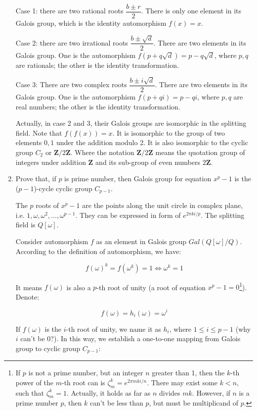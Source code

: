 \documentclass[UTF8]{article}
\begin{document}
\begin{enumerate}
Case 1: there are two rational roots $\dfrac{b \pm r}{2}$. There is only one element in its Galois group, which is the identity automorphism $f(x) = x$.

Case 2: there are two irrational roots $\dfrac{b \pm \sqrt{d}}{2}$. There are two elements in its Galois group. One is the automorphism $f(p + q \sqrt{d}) = p - q \sqrt{d}$, where $p, q$ are rationals; the other is the identity transformation.

Case 3: There are two complex roots $\dfrac{b \pm i \sqrt{d}}{2}$. There are two elements in its Galois group. One is the automorphism $f(p + q i) = p - q i$, where $p, q$ are real numbers; the other is the identity transformation.

Actually, in case 2 and 3, their Galois groups are isomorphic in the splitting field. Note that $f(f(x)) = x$. It is isomorphic to the group of two elements ${0, 1}$ under the addition modulo 2. It is also isomorphic to the cyclic group $C_2$ or $\pmb{Z}/2\pmb{Z}$. Where the notation $\pmb{Z}/2\pmb{Z}$ means the quotation group of integers under addition $\pmb{Z}$ and its sub-group of even numbers $2\pmb{Z}$.

\item{Prove that, if $p$ is prime number, then Galois group for equation $x^p - 1$ is the ($p-1$)-cycle cyclic group $C_{p-1}$.}

The $p$ roots of $x^p - 1$ are the points along the unit circle in complex plane, i.e. $1, \omega, \omega^2, ..., \omega^{p-1}$. They can be expressed in form of $e^{2 \pi k i / p}$. The splitting field is $Q[\omega]$.

Consider automorphism $f$ as an element in Galois group $Gal(Q[\omega]/Q)$. According to the definition of automorphism, we have:

\[
f(\omega)^k = f(\omega^k) = 1 \iff \omega^k = 1
\]

It means $f(\omega)$ is also a $p$-th root of unity (a root of equation $x^p - 1 = 0$\footnote{If $p$ is not a prime number, but an integer $n$ greater than 1, then the $k$-th power of the $m$-th root can is $\zeta_m^k = e^{2 \pi m k i / n}$. There may exist some $k < n$, such that $\zeta_m^k = 1$. Actually, it holds as far as $n$ divides $mk$. However, if $n$ is a prime number $p$, then $k$ can't be less than $p$, but must be multiplicand of $p$.}). Denote:

\[
f(\omega) = h_i(\omega) = \omega^{i}
\]

If $f(\omega)$ is the $i$-th root of unity, we name it as $h_i$, where $1 \leq i \leq p-1$ (why $i$ can't be 0?). In this way, we establish a one-to-one mapping from Galois group to cyclic group $C_{p-1}$:


\end{enumerate}
\end{document}
